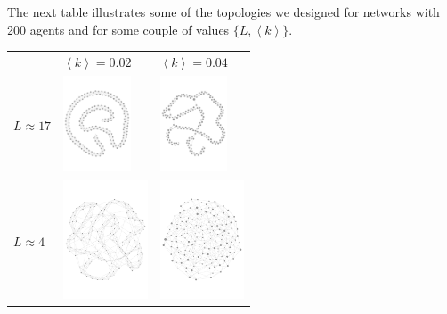 \documentclass[a1paper,portrait,showframe,fontscale=.45]{baposter}
\begin{document}
\begin{poster}
{\begin{multicols}{2}
					\columnbreak 

					The next table illustrates some of the topologies we designed for networks with 200 agents and for some couple of values $\{L,\left\langle k\right\rangle\}$.
					\begin{center}
						\begin{tabular}{m{1.2cm}m{2cm}m{2cm}}
							&$\left\langle k\right\rangle=0.02$ & $\left\langle k\right\rangle=0.04$\\
							$L\approx17$&
							\includegraphics[width=2cm]{img/g02.pdf}&
							\includegraphics[width=2cm]{img/g00.pdf}\\
							$L\approx4$&
							\includegraphics[width=2.5cm]{img/g42.pdf}&
							\includegraphics[width=2.5cm]{img/g40.pdf}\\
						\end{tabular}
					\end{center}

\end{multicols}}
\end{poster}
\end{document}
